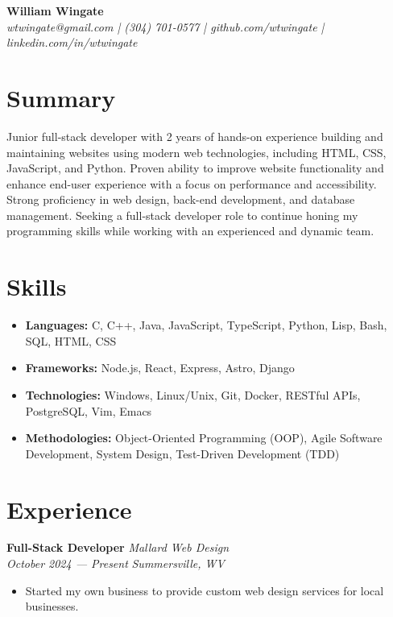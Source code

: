 \documentclass[letterpaper, 11pt]{article}
\begin{document}
\thispagestyle{empty}


\begin{center}
  {\LARGE \textbf{William Wingate}} \\
  \vspace{10pt}
  \textit{wtwingate@gmail.com | (304) 701-0577 | github.com/wtwingate
    | linkedin.com/in/wtwingate}
\end{center}


\section*{Summary}
Junior full-stack developer with 2 years of hands-on experience
building and maintaining websites using modern web technologies,
including HTML, CSS, JavaScript, and Python.  Proven ability to
improve website functionality and enhance end-user experience with a
focus on performance and accessibility.  Strong proficiency in web
design, back-end development, and database management.  Seeking a
full-stack developer role to continue honing my programming skills
while working with an experienced and dynamic team.


\section*{Skills}
\begin{itemize}
\item \textbf{Languages:} C, C++, Java, JavaScript, TypeScript,
  Python, Lisp, Bash, SQL, HTML, CSS
\item \textbf{Frameworks:} Node.js, React, Express, Astro, Django
\item \textbf{Technologies:} Windows, Linux/Unix, Git, Docker, RESTful
  APIs, PostgreSQL, Vim, Emacs
\item \textbf{Methodologies:} Object-Oriented Programming (OOP), Agile
  Software Development, System Design, Test-Driven Development (TDD)
\end{itemize}


\section*{Experience}
\textbf{Full-Stack Developer}
\hfill \textit{Mallard Web Design} \\
\textit{October 2024 — Present}
\hfill \textit{Summersville, WV}
\begin{itemize}
\item Started my own business to provide custom web design services
  for local businesses.
\end{itemize}
\end{document}
